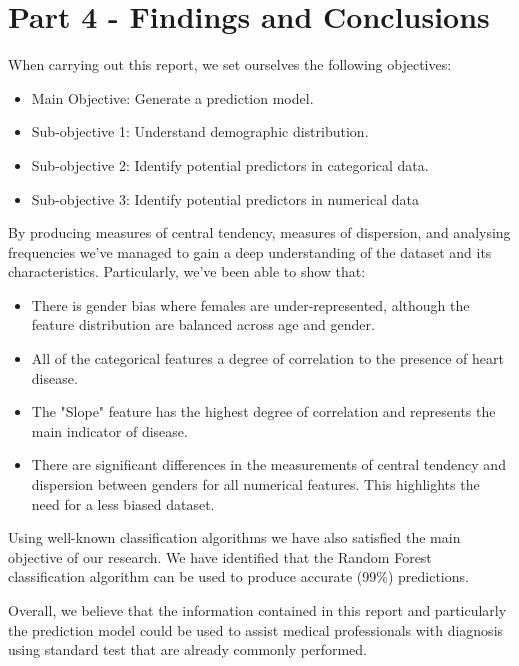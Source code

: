 \section{Part 4 - Findings and Conclusions}

When carrying out this report, we set ourselves the following objectives:

\begin{itemize}
    \item Main Objective: Generate a prediction model.
    \item Sub-objective 1: Understand demographic distribution.
    \item Sub-objective 2: Identify potential predictors in categorical data.
    \item Sub-objective 3: Identify potential predictors in numerical data
\end{itemize}

By producing measures of central tendency, measures of dispersion, and analysing frequencies we've managed 
to gain a deep understanding of the dataset and its characteristics. Particularly, we've been able to show
that:

\begin{itemize}
    \item There is gender bias where females are under-represented, although the feature distribution are balanced across age and gender.
    \item All of the categorical features a degree of correlation to the presence of heart disease.
    \item The "Slope" feature has the highest degree of correlation and represents the main indicator of disease.
    \item There are significant differences in the measurements of central tendency and dispersion between genders for all numerical features. This highlights the need for a less biased dataset.
\end{itemize}

Using well-known classification algorithms we have also satisfied the main objective of our research. We have
identified that the Random Forest classification algorithm can be used to produce accurate (99\%) predictions.

Overall, we believe that the information contained in this report and particularly the prediction model could
be used to assist medical professionals with diagnosis using standard test that are already commonly performed.